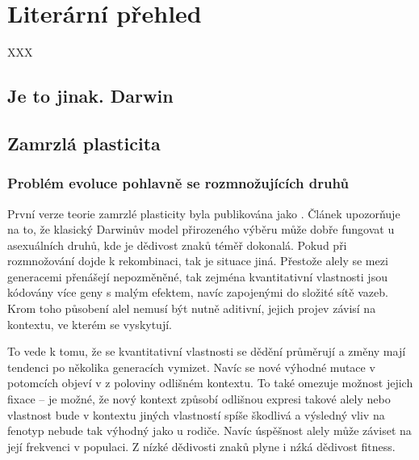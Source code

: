 \chapter{Literární přehled}


XXX

%
\section{Je to jinak. Darwin}
%
%
%
\section{Zamrzlá plasticita}

\subsection{Problém evoluce pohlavně se rozmnožujících druhů}

První verze teorie zamrzlé plasticity byla publikována jako \citet{flegr1998origin}. Článek upozorňuje na to, že
klasický Darwinův model přirozeného výběru může dobře fungovat u asexuálních druhů, kde je dědivost znaků téměř
dokonalá.
Pokud při rozmnožování dojde k rekombinaci, tak je situace jiná. Přestože alely se mezi generacemi přenášejí
nepozměněné, tak zejména kvantitativní vlastnosti jsou kódovány více geny s malým efektem, navíc zapojenými do
složité sítě vazeb. Krom toho působení alel nemusí být nutně aditivní, jejich projev závisí na kontextu,
ve kterém se vyskytují.

To vede k tomu, že se kvantitativní vlastnosti se dědění průměrují a změny mají tendenci po
několika generacích vymizet. Navíc se nové výhodné mutace v potomcích objeví v z poloviny odlišném kontextu. To také
omezuje možnost jejich fixace -- je možné, že nový kontext způsobí odlišnou expresi takové alely nebo vlastnost bude
v kontextu jiných vlastností spíše škodlivá a výsledný vliv na fenotyp nebude tak výhodný jako u rodiče. Navíc
úspěšnost alely může záviset na její frekvenci v populaci. Z nízké dědivosti znaků plyne i nźká dědivost fitness.

